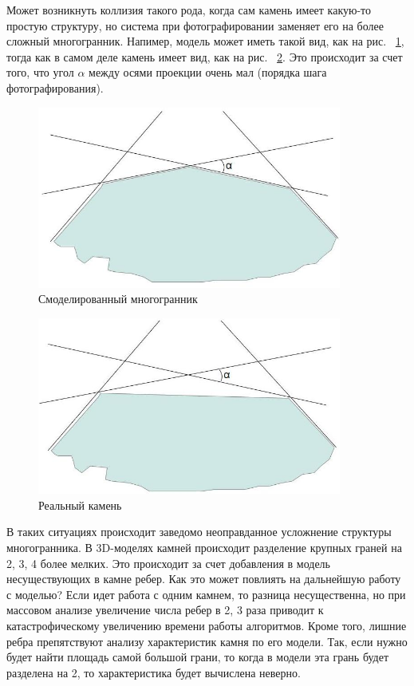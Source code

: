 \documentclass[a4paper,12pt, titlepage]{article}
\begin{document}
\begin{flushleft}
  Может возникнуть коллизия такого рода, когда сам камень имеет какую-то простую структуру, но система
при фотографировании заменяет его на более сложный многогранник. Напимер, модель может иметь такой вид,
как на рис. ~\ref{poly-model}, тогда как в самом деле камень имеет вид, как на рис. ~\ref{poly-real}. Это происходит за счет того, что
угол $\alpha$ между осями проекции очень мал (порядка шага фотографирования).
\end{flushleft}
\begin{flushleft}
  \begin{figure}[h]
    \includegraphics[clip, width=10cm]{img/contour-1.jpg}
    \caption{Смоделированный многогранник}\label{poly-model}
  \end{figure}
  \begin{figure}[h]
    \includegraphics[clip, width=10cm]{img/contour-2.jpg}
    \caption{Реальный камень}\label{poly-real} 
  \end{figure}
\end{flushleft}
\begin{flushleft}
  В таких ситуациях происходит заведомо неоправданное усложнение структуры многогранника. В 3D-моделях
камней происходит разделение крупных граней на 2, 3, 4 более мелких. Это происходит за счет добавления 
в модель несуществующих в камне ребер. Как это может повлиять на дальнейшую работу с моделью? Если идет работа 
с одним камнем, то разница несущественна, но при массовом анализе увеличение числа ребер в 2, 3 раза приводит
к катастрофическому увеличению времени работы алгоритмов. Кроме того, лишние ребра препятствуют анализу характеристик
камня по его модели. Так, если нужно будет найти площадь самой большой грани, то когда в модели эта грань будет 
разделена на 2, то характеристика будет вычислена неверно.
\end{flushleft}
\end{document}
